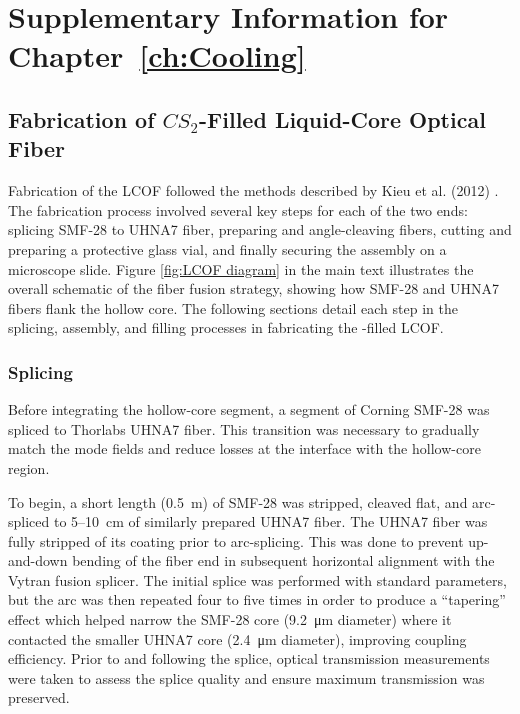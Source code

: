 \doublespacing
\chapter{Supplementary Information for Chapter~\ref{ch:Cooling}}
\label{Cooling:Appendix}
\acresetall

\section{Fabrication of \texorpdfstring{$CS_{2}$}{CS2}-Filled Liquid-Core Optical Fiber}
\label{Cooling:Appendix:sec:FabricationofCS2FilledLCOF}

Fabrication of the \ac{LCOF} followed the methods described by Kieu et al. (2012) \cite{kieu2012integrated}. The fabrication process involved several key steps for each of the two ends: splicing \ac{SMF-28} to \ac{UHNA7} fiber, preparing and angle-cleaving fibers, cutting and preparing a protective glass vial, and finally securing the assembly on a microscope slide. Figure \ref{fig:LCOF diagram} in the main text illustrates the overall schematic of the fiber fusion strategy, showing how \ac{SMF-28} and \ac{UHNA7} fibers flank the hollow core. The following sections detail each step in the splicing, assembly, and filling processes in fabricating the -filled \ac{LCOF}.

\subsection{Splicing}
\label{Cooling:Appendix:subsec:Splicing}

Before integrating the hollow-core segment, a segment of Corning \ac{SMF-28} was spliced to Thorlabs \ac{UHNA7} fiber. This transition was necessary to gradually match the mode fields and reduce losses at the interface with the hollow-core region.

To begin, a short length (\SI{0.5}{\meter}) of \ac{SMF-28} was stripped, cleaved flat, and arc-spliced to 5–\SI{10}{\centi\meter} of similarly prepared \ac{UHNA7} fiber. The \ac{UHNA7} fiber was fully stripped of its coating prior to arc-splicing. This was done to prevent up-and-down bending of the fiber end in subsequent horizontal alignment with the Vytran fusion splicer. The initial splice was performed with standard parameters, but the arc was then repeated four to five times in order to produce a “tapering” effect which helped narrow the \ac{SMF-28} core (\SI{9.2}{\micro\meter} diameter) where it contacted the smaller \ac{UHNA7} core (\SI{2.4}{\micro\meter} diameter), improving coupling efficiency. Prior to and following the splice, optical transmission measurements were taken to assess the splice quality and ensure maximum transmission was preserved.

